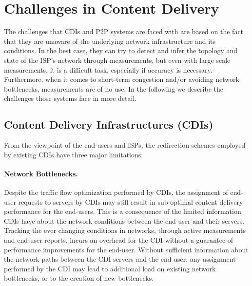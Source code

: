\section{Challenges in Content Delivery}\label{sec:challenges}

The challenges that CDIs and P2P systems are faced with are based on the fact
that they are unaware of the underlying network infrastructure and its
conditions. In the best case, they can try to detect and infer the topology and
state of the ISP's network through measurements, but even with large scale
measurements, it is a difficult task, especially if accuracy is necessary.
Furthermore, when it comes to short-term congestion and/or avoiding network
bottlenecks, measurements are of no use. In the following we describe the
challenges those systems face in more detail.

\subsection{Content Delivery Infrastructures (CDIs)}\label{sec:CDIs-and-Challenges}

From the viewpoint of the end-users and ISPs, the redirection schemes employed
by existing CDIs have three major limitations:

\paragraph{Network Bottlenecks.} Despite the traffic flow optimization
performed by CDIs, the assignment of end-user requests to servers by CDIs may
still result in sub-optimal content delivery performance for the end-users.
This is a consequence of the limited information CDIs have about the network
conditions between the end-user and their servers. Tracking the ever changing
conditions in networks, \ie through active measurements and end-user reports,
incurs an overhead for the CDI without a guarantee of performance improvements
for the end-user.  Without sufficient information about the network paths
between the CDI servers and the end-user, any assignment performed by the CDI
may lead to additional load on existing network bottlenecks, or to the creation
of new bottlenecks.


